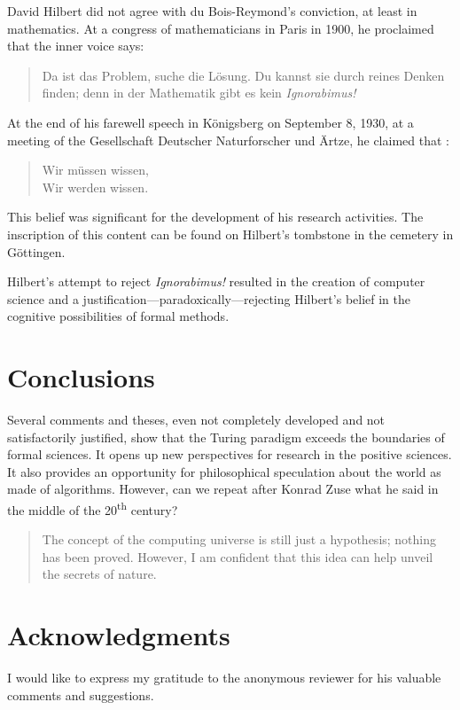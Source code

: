 \documentclass[pdftex,12pt]{article}
\begin{document}
David Hilbert \parencite*{Hilbert1900} did not agree with du Bois-Reymond's conviction, at least in mathematics. At a congress of mathematicians in Paris in 1900, he proclaimed that the inner voice says: \begin{quote} \small Da ist das Problem, suche die L{\"o}sung.  Du kannst sie durch reines Denken  finden; denn in der Mathematik gibt es kein \emph{Ignorabimus!} \end{quote}

At the end of his farewell speech in Königsberg on September 8, 1930, at a meeting of the Gesellschaft Deutscher Naturforscher und {\"A}rtze, he claimed that \parencites[p.387] {Hilbert1935a}[see also][]{smith_david_2014}: \begin{quote} \small Wir m{\"u}ssen wissen, \\ Wir werden wissen.
\end{quote} This belief was significant for the development of his research activities. The inscription of this content can be found on Hilbert's tombstone in the cemetery in G{\"o}ttingen.

Hilbert's attempt to reject \emph{Ignorabimus!} resulted in the creation of computer science and a justification---paradoxically---rejecting Hilbert's belief in the cognitive possibilities of formal methods.




\section{Conclusions} 
Several comments and theses, even not completely developed and not satisfactorily justified, show that the Turing paradigm exceeds the boundaries of formal sciences. It opens up new perspectives for research in the positive sciences. It also provides an opportunity for philosophical speculation about the world as made of algorithms. However, can we  repeat after Konrad Zuse \parencite[p.65]{German2012} what he said in the middle of the 20\textsuperscript{th} century? \begin{quote}  The concept of the computing universe is still just a hypothesis; nothing has been proved. However, I am confident that this idea can help unveil the secrets of nature. \end{quote}

\section{Acknowledgments}
I would like to express my gratitude to the anonymous reviewer for his valuable comments and suggestions.
\end{document}
